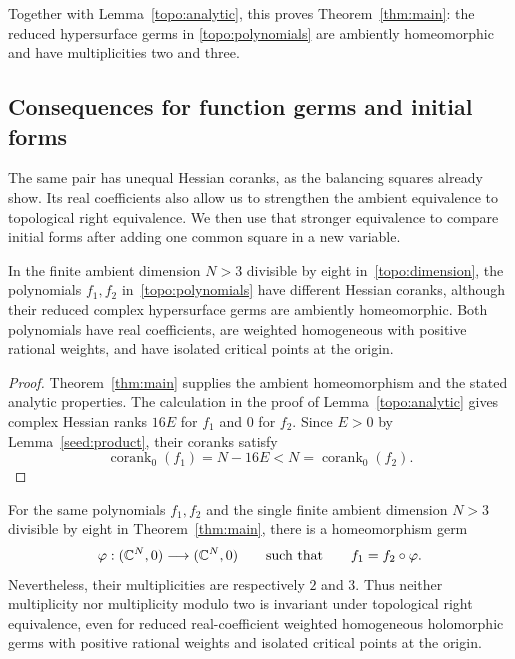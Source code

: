 Together with Lemma~\ref{topo:analytic}, this proves
Theorem~\ref{thm:main}: the reduced hypersurface germs in
\eqref{topo:polynomials} are ambiently homeomorphic and have
multiplicities two and three.

\subsection{Consequences for function germs and initial forms}
\label{topo:consequences}

The same pair has unequal Hessian coranks, as the balancing squares
already show.  Its real coefficients also allow us to strengthen the
ambient equivalence to topological right equivalence.  We then use that
stronger equivalence to compare initial forms after adding one common
square in a new variable.

\begin{corollary}
\label{topo:arnold-corank}
In the finite ambient dimension $N>3$ divisible by eight
in~\eqref{topo:dimension}, the polynomials $f_1,f_2$
in~\eqref{topo:polynomials} have different Hessian coranks, although
their reduced complex hypersurface germs are ambiently homeomorphic.
Both polynomials have real coefficients, are weighted homogeneous with
positive rational weights, and have isolated critical points at the origin.
\end{corollary}

\begin{proof}
Theorem~\ref{thm:main} supplies the ambient homeomorphism and the stated
analytic properties. The calculation in the proof of
Lemma~\ref{topo:analytic} gives complex Hessian ranks $16E$ for $f_1$
and $0$ for $f_2$. Since $E>0$ by Lemma~\ref{seed:product}, their
coranks satisfy
\[
 \operatorname{corank}_0(f_1)=N-16E<N=\operatorname{corank}_0(f_2).
\]
\end{proof}

\begin{corollary}
\label{topo:right-equivalence}
For the same polynomials $f_1,f_2$ and the single finite ambient dimension
$N>3$ divisible by eight in Theorem~\ref{thm:main}, there is a homeomorphism
germ
\[
 \varphi:(\mathbb C^N,0)\longrightarrow(\mathbb C^N,0)
 \qquad\text{such that}\qquad
 f_1=f_2\circ\varphi.
\]
Nevertheless, their multiplicities are respectively $2$ and $3$. Thus
neither multiplicity nor multiplicity modulo two is invariant under
topological right equivalence, even for reduced real-coefficient weighted
homogeneous holomorphic germs with positive rational weights and isolated
critical points at the origin.
\end{corollary}

